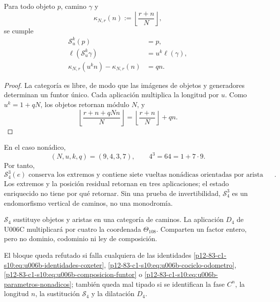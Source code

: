 {\begin{theorem}
\label{p12-83-c1-s10:thm:u006b-elevacion-modular}
Para todo objeto \(p\), camino \(\gamma\) y
\[
 \kappa_{N,r}(n):=
 \left\lfloor\frac{r+n}{N}\right\rfloor,
\]
se cumple
\begin{align}
 \mathcal S_u^k(p)&=p,
 \label{p12-83-c1-s10:eq:u006b-retorno-objetos}\\
 \ell(\mathcal S_u^k\gamma)&=u^k\ell(\gamma),
 \label{p12-83-c1-s10:eq:u006b-longitud-sustituida}\\
 \kappa_{N,r}(u^kn)-\kappa_{N,r}(n)&=qn.
 \label{p12-83-c1-s10:eq:u006b-diferencia-vueltas}
\end{align}
\end{theorem}

\begin{proof}
La categoría es libre, de modo que las imágenes de objetos y generadores
determinan un funtor único. Cada aplicación multiplica la longitud por
\(u\). Como \(u^k=1+qN\), los objetos retornan módulo \(N\), y
\[
 \left\lfloor
 \frac{r+n+qNn}{N}
 \right\rfloor
 =
 \left\lfloor\frac{r+n}{N}\right\rfloor+qn.
\]
\end{proof}

En el caso nonádico,
\begin{equation}
 (N,u,k,q)=(9,4,3,7),
 \qquad
 4^3=64=1+7\cdot9.
 \label{p12-83-c1-s10:eq:u006b-parametros-nonadicos}
\end{equation}
Por tanto,
\begin{equation}
 \boxed{
 \mathcal S_4^3(e)
 \text{ conserva los extremos y contiene siete vueltas nonádicas
 orientadas por arista inicial}.}
 \label{p12-83-c1-s10:eq:u006b-siete-vueltas}
\end{equation}
Los extremos y la posición residual retornan en tres aplicaciones; el
estado enriquecido no tiene por qué retornar. Sin una prueba de
invertibilidad, \(\mathcal S_4^3\) es un endomorfismo vertical de caminos,
no una monodromía.

\begin{remark}
\label{p12-83-c1-s10:rem:u006b-s4-no-d4}
\(\mathcal S_4\) sustituye objetos y aristas en una categoría de caminos.
La aplicación \(D_4\) de U006C multiplicará por cuatro la coordenada
\(\Theta_{108}\). Comparten un factor entero, pero no dominio, codominio ni
ley de composición.
\end{remark}

\begin{criterion}
\label{p12-83-c1-s10:crit:u006b-refutacion}
El bloque queda refutado si falla cualquiera de las identidades
\eqref{p12-83-c1-s10:eq:u006b-identidades-coxeter},
\eqref{p12-83-c1-s10:eq:u006b-cociclo-odometro},
\eqref{p12-83-c1-s10:eq:u006b-composicion-funtor} o
\eqref{p12-83-c1-s10:eq:u006b-parametros-nonadicos}; también queda mal tipado si se
identifican la fase \(C^n\), la longitud \(n\), la sustitución
\(\mathcal S_4\) y la dilatación \(D_4\).
\end{criterion}
}%


